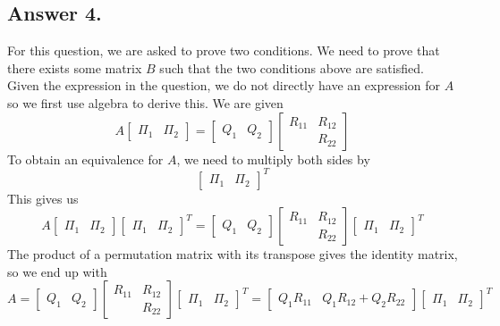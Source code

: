 \documentclass[12pt]{article}
\begin{document}
\subsection*{Answer 4.}
For this question, we are asked to prove two conditions. We need to prove that there exists some matrix $B$ such that the two conditions above are satisfied. Given the expression in the question, we do not directly have an expression for $A$ so we first use algebra to derive this. We are given 
\begin{equation*}
    A\begin{bmatrix}\Pi_1 & \Pi_2\end{bmatrix} = \begin{bmatrix} Q_1 & Q_2\end{bmatrix} \begin{bmatrix} R_{11} & R_{12} \\ & R_{22}\end{bmatrix}
\end{equation*}
To obtain an equivalence for $A$, we need to multiply both sides by \[{\begin{bmatrix}\Pi_1 & \Pi_2\end{bmatrix}}^T\]
This gives us \begin{equation*}
    A\begin{bmatrix}\Pi_1 & \Pi_2\end{bmatrix}{\begin{bmatrix}\Pi_1 & \Pi_2\end{bmatrix}}^T = \begin{bmatrix} Q_1 & Q_2\end{bmatrix} \begin{bmatrix} R_{11} & R_{12} \\ & R_{22}\end{bmatrix}{\begin{bmatrix}\Pi_1 & \Pi_2\end{bmatrix}}^T
\end{equation*}
The product of a permutation matrix with its transpose gives the identity matrix, so we end up with 
\begin{equation*}
    A = \begin{bmatrix} Q_1 & Q_2\end{bmatrix} \begin{bmatrix} R_{11} & R_{12} \\ & R_{22}\end{bmatrix}{\begin{bmatrix}\Pi_1 & \Pi_2\end{bmatrix}}^T = \begin{bmatrix} Q_1R_{11} & Q_1R_{12}+Q_2R_{22}\end{bmatrix}{\begin{bmatrix}\Pi_1 & \Pi_2\end{bmatrix}}^T
\end{equation*}
\end{document}

